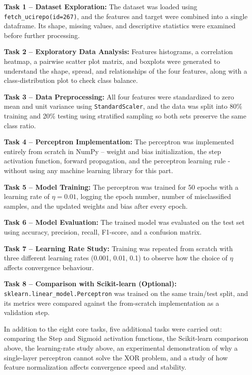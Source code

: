\documentclass[11pt]{article}
\begin{document}
\textbf{Task 1 -- Dataset Exploration:} The dataset was loaded using \texttt{fetch\_ucirepo(id=267)}, and the features and target were combined into a single dataframe. Its shape, missing values, and descriptive statistics were examined before further processing.

\textbf{Task 2 -- Exploratory Data Analysis:} Features histograms, a correlation heatmap, a pairwise scatter plot matrix, and boxplots were generated to understand the shape, spread, and relationships of the four features, along with a class-distribution plot to check class balance.

\textbf{Task 3 -- Data Preprocessing:} All four features were standardized to zero mean and unit variance using \texttt{StandardScaler}, and the data was split into 80\% training and 20\% testing using stratified sampling so both sets preserve the same class ratio.

\textbf{Task 4 -- Perceptron Implementation:} The perceptron was implemented entirely from scratch in NumPy -- weight and bias initialization, the step activation function, forward propagation, and the perceptron learning rule -without using any machine learning library for this part.

\textbf{Task 5 -- Model Training:} The perceptron was trained for 50 epochs with a learning rate of $\eta = 0.01$, logging the epoch number, number of misclassified samples, and the updated weights and bias after every epoch.

\textbf{Task 6 -- Model Evaluation:} The trained model was evaluated on the test set using accuracy, precision, recall, F1-score, and a confusion matrix.

\textbf{Task 7 -- Learning Rate Study:} Training was repeated from scratch with three different learning rates (0.001, 0.01, 0.1) to observe how the choice of $\eta$ affects convergence behaviour.

\textbf{Task 8 -- Comparison with Scikit-learn (Optional):} \texttt{sklearn.linear\_model.Perceptron} was trained on the same train/test split, and its metrics were compared against the from-scratch implementation as a validation step.

In addition to the eight core tasks, five additional tasks were carried out: comparing the Step and Sigmoid activation functions, the Scikit-learn comparison above, the learning-rate study above, an experimental demonstration of why a single-layer perceptron cannot solve the XOR problem, and a study of how feature normalization affects convergence speed and stability.
\end{document}
